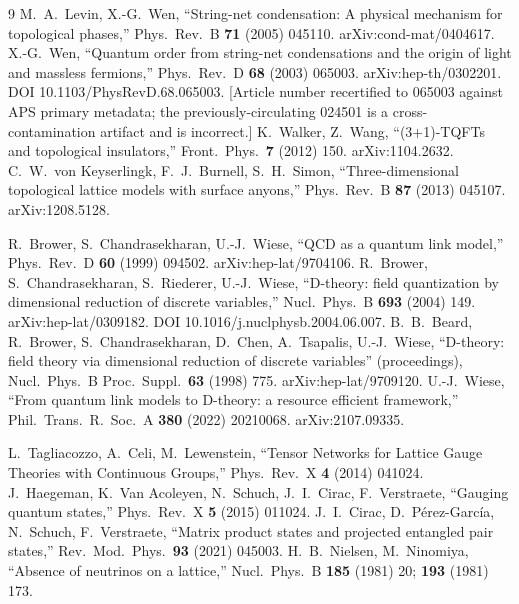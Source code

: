\documentclass[12pt,a4paper,twoside]{article}
\theoremstyle{plain}
\theoremstyle{definition}
\theoremstyle{remark}
\begin{document}
\begin{thebibliography}{9}
M.~A.~Levin, X.-G.~Wen, ``String-net condensation: A physical mechanism for topological phases,'' Phys.\ Rev.\ B \textbf{71} (2005) 045110. arXiv:cond-mat/0404617.
X.-G.~Wen, ``Quantum order from string-net condensations and the origin of light and massless fermions,'' Phys.\ Rev.\ D \textbf{68} (2003) 065003. arXiv:hep-th/0302201. DOI 10.1103/PhysRevD.68.065003. [Article number recertified to 065003 against APS primary metadata; the previously-circulating 024501 is a cross-contamination artifact and is incorrect.]
K.~Walker, Z.~Wang, ``(3+1)-TQFTs and topological insulators,'' Front.\ Phys.\ \textbf{7} (2012) 150. arXiv:1104.2632.
C.~W.~von Keyserlingk, F.~J.~Burnell, S.~H.~Simon, ``Three-dimensional topological lattice models with surface anyons,'' Phys.\ Rev.\ B \textbf{87} (2013) 045107. arXiv:1208.5128.

R.~Brower, S.~Chandrasekharan, U.-J.~Wiese, ``QCD as a quantum link model,'' Phys.\ Rev.\ D \textbf{60} (1999) 094502. arXiv:hep-lat/9704106.
R.~Brower, S.~Chandrasekharan, S.~Riederer, U.-J.~Wiese, ``D-theory: field quantization by dimensional reduction of discrete variables,'' Nucl.\ Phys.\ B \textbf{693} (2004) 149. arXiv:hep-lat/0309182. DOI 10.1016/j.nuclphysb.2004.06.007.
B.~B.~Beard, R.~Brower, S.~Chandrasekharan, D.~Chen, A.~Tsapalis, U.-J.~Wiese, ``D-theory: field theory via dimensional reduction of discrete variables'' (proceedings), Nucl.\ Phys.\ B Proc.\ Suppl.\ \textbf{63} (1998) 775. arXiv:hep-lat/9709120.
U.-J.~Wiese, ``From quantum link models to D-theory: a resource efficient framework,'' Phil.\ Trans.\ R.\ Soc.\ A \textbf{380} (2022) 20210068. arXiv:2107.09335.

L.~Tagliacozzo, A.~Celi, M.~Lewenstein, ``Tensor Networks for Lattice Gauge Theories with Continuous Groups,'' Phys.\ Rev.\ X \textbf{4} (2014) 041024.
J.~Haegeman, K.~Van Acoleyen, N.~Schuch, J.~I.~Cirac, F.~Verstraete, ``Gauging quantum states,'' Phys.\ Rev.\ X \textbf{5} (2015) 011024.
J.~I.~Cirac, D.~P\'erez-Garc\'ia, N.~Schuch, F.~Verstraete, ``Matrix product states and projected entangled pair states,'' Rev.\ Mod.\ Phys.\ \textbf{93} (2021) 045003.
H.~B.~Nielsen, M.~Ninomiya, ``Absence of neutrinos on a lattice,'' Nucl.\ Phys.\ B \textbf{185} (1981) 20; \textbf{193} (1981) 173.


\end{thebibliography}
\end{document}
